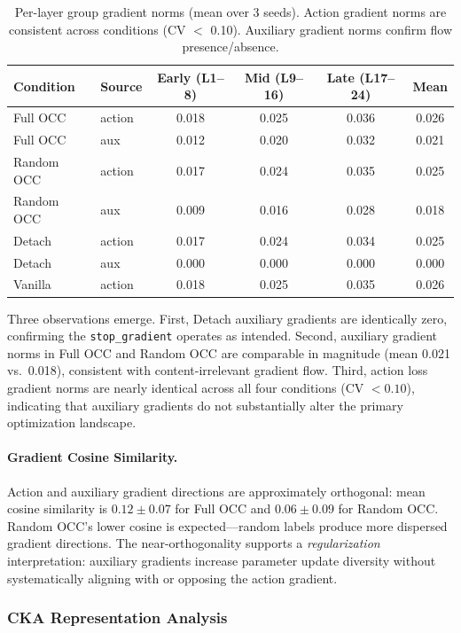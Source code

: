 \documentclass[10pt,letterpaper]{article}
\begin{document}
\begin{table}[t]
\centering
\caption{Per-layer group gradient norms (mean over 3 seeds). Action gradient norms are consistent across conditions (CV $<$ 0.10). Auxiliary gradient norms confirm flow presence/absence.}
\label{tab:grad}
\begin{tabular}{llcccc}
\toprule
Condition & Source & Early (L1--8) & Mid (L9--16) & Late (L17--24) & Mean \\
\midrule
Full OCC    & action & 0.018 & 0.025 & 0.036 & 0.026 \\
Full OCC    & aux    & 0.012 & 0.020 & 0.032 & 0.021 \\
Random OCC  & action & 0.017 & 0.024 & 0.035 & 0.025 \\
Random OCC  & aux    & 0.009 & 0.016 & 0.028 & 0.018 \\
Detach      & action & 0.017 & 0.024 & 0.034 & 0.025 \\
Detach      & aux    & 0.000 & 0.000 & 0.000 & 0.000 \\
Vanilla     & action & 0.018 & 0.025 & 0.035 & 0.026 \\
\bottomrule
\end{tabular}
\end{table}

Three observations emerge. First, Detach auxiliary gradients are identically zero, confirming the \texttt{stop\_gradient} operates as intended. Second, auxiliary gradient norms in Full OCC and Random OCC are comparable in magnitude (mean 0.021 vs.\ 0.018), consistent with content-irrelevant gradient flow. Third, action loss gradient norms are nearly identical across all four conditions (CV $< 0.10$), indicating that auxiliary gradients do not substantially alter the primary optimization landscape.

\paragraph{Gradient Cosine Similarity.}
Action and auxiliary gradient directions are approximately orthogonal: mean cosine similarity is $0.12 \pm 0.07$ for Full OCC and $0.06 \pm 0.09$ for Random OCC. Random OCC's lower cosine is expected---random labels produce more dispersed gradient directions. The near-orthogonality supports a \emph{regularization} interpretation: auxiliary gradients increase parameter update diversity without systematically aligning with or opposing the action gradient.

\subsubsection{CKA Representation Analysis}
\label{sec:cka}
\end{document}
